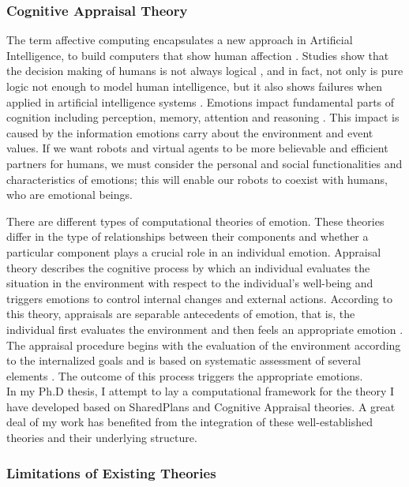 \documentclass[a4paper, 10pt]{article}
\begin{document}
\begin{small}
\subsubsection*{Cognitive Appraisal Theory}

The term affective computing encapsulates a new approach in Artificial
Intelligence, to build computers that show human affection
\cite{picard:affective-computing}. Studies show that the decision making of
humans is not always logical \cite{GrossbergGutowski:affect-cognition}, and in
fact, not only is pure logic not enough to model human intelligence, but it also
shows failures when applied in artificial intelligence systems
\cite{dreyfus:artificial-critique}. Emotions impact fundamental parts of
cognition including perception, memory, attention and reasoning
\cite{clore:judgement-regulation}. This impact is caused by the information
emotions carry about the environment and event values. If we want robots and
virtual agents to be more believable and efficient partners for humans, we must
consider the personal and social functionalities and characteristics of
emotions; this will enable our robots to coexist with humans, who are emotional
beings.

There are different types of computational theories of emotion. These theories
differ in the type of relationships between their components and whether a
particular component plays a crucial role in an individual emotion. Appraisal
theory describes the cognitive process by which an individual evaluates the
situation in the environment with respect to the individual's well-being and
triggers emotions to control internal changes and external actions. According to
this theory, appraisals are separable antecedents of emotion, that is, the
individual first evaluates the environment and then feels an appropriate emotion
\cite{scherer:appraisal-processes}. The appraisal procedure begins with the
evaluation of the environment according to the internalized goals and is based
on systematic assessment of several elements
\cite{scherer:sequential-appraisal-process}. The outcome of this process
triggers the appropriate emotions.\\


In my Ph.D thesis, I attempt to lay a computational framework for the theory I
have developed based on SharedPlans and Cognitive Appraisal theories. A great
deal of my work has benefited from the integration of these well-established
theories and their underlying structure.

\subsubsection*{Limitations of Existing Theories}


\end{small}
\end{document}
